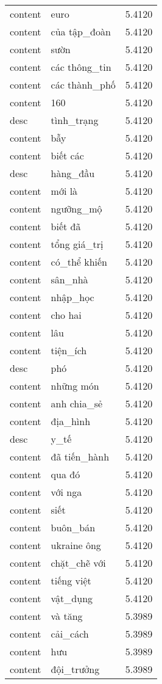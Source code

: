 \documentclass{article}
\begin{document}
\begin{tabular}{lll}
content & euro & 5.4120\\
content & của tập\_đoàn & 5.4120\\
content & sườn & 5.4120\\
content & các thông\_tin & 5.4120\\
content & các thành\_phố & 5.4120\\
content & 160 & 5.4120\\
desc & tình\_trạng & 5.4120\\
content & bẫy & 5.4120\\
content & biết các & 5.4120\\
desc & hàng\_đầu & 5.4120\\
content & mới là & 5.4120\\
content & ngưỡng\_mộ & 5.4120\\
content & biết đã & 5.4120\\
content & tổng giá\_trị & 5.4120\\
content & có\_thể khiến & 5.4120\\
content & sân\_nhà & 5.4120\\
content & nhập\_học & 5.4120\\
content & cho hai & 5.4120\\
content & lâu & 5.4120\\
content & tiện\_ích & 5.4120\\
desc & phó & 5.4120\\
content & những món & 5.4120\\
content & anh chia\_sẻ & 5.4120\\
content & địa\_hình & 5.4120\\
desc & y\_tế & 5.4120\\
content & đã tiến\_hành & 5.4120\\
content & qua đó & 5.4120\\
content & với nga & 5.4120\\
content & siết & 5.4120\\
content & buôn\_bán & 5.4120\\
content & ukraine ông & 5.4120\\
content & chặt\_chẽ với & 5.4120\\
content & tiếng việt & 5.4120\\
content & vật\_dụng & 5.4120\\
content & và tăng & 5.3989\\
content & cải\_cách & 5.3989\\
content & hưu & 5.3989\\
content & đội\_trưởng & 5.3989\\

\end{tabular}
\end{document}
